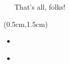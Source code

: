 \documentclass[xetex,18pt,aspectratio=43]{beamer}
\begin{document}
\begin{Large}
\begin{frame}{\ \ \ That's all, folks!}
\begin{textblock*}{\framewidth-0.8cm}(0.5cm,1.5cm)
\begin{itemize}
  \item \href{mailto:alex@gitinsky.com}{\color{blue}{alex@gitinsky.com}}
  \item \href{https://telegram.me/lhommequipleure}{\color{blue}{https://telegram.me/lhommequipleure}}
\end{itemize}
\end{textblock*}
\end{frame}
\end{Large}
\end{document}
